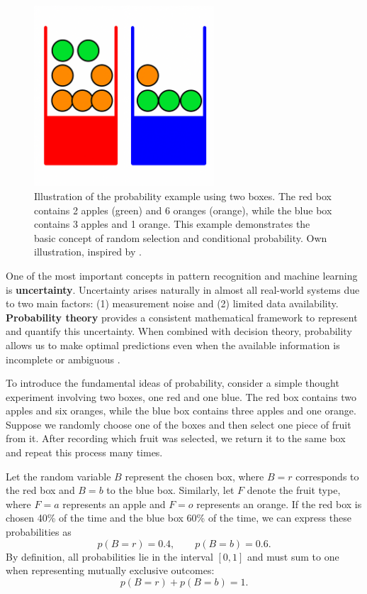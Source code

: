 \documentclass[12pt]{article}
\begin{document}
\begin{figure}[h!]
    \centering
    \includegraphics[width=0.6\textwidth]{images/probability_boxes.png}
    \caption{Illustration of the probability example using two boxes. 
    The red box contains 2 apples (green) and 6 oranges (orange), 
    while the blue box contains 3 apples and 1 orange. 
    This example demonstrates the basic concept of random selection and conditional probability. 
    Own illustration, inspired by \cite{bishop2006pattern}.}
    \label{fig:fruit_boxes}
\end{figure}

One of the most important concepts in pattern recognition and machine learning is \textbf{uncertainty}. 
Uncertainty arises naturally in almost all real-world systems due to two main factors: 
(1) measurement noise and (2) limited data availability. 
\textbf{Probability theory} provides a consistent mathematical framework to represent and quantify this uncertainty. 
When combined with decision theory, probability allows us to make optimal predictions even when the available information is incomplete or ambiguous \cite{bishop2006pattern}.

To introduce the fundamental ideas of probability, consider a simple thought experiment involving two boxes, one red and one blue. 
The red box contains two apples and six oranges, while the blue box contains three apples and one orange. 
Suppose we randomly choose one of the boxes and then select one piece of fruit from it. 
After recording which fruit was selected, we return it to the same box and repeat this process many times.

Let the random variable \( B \) represent the chosen box, where \( B = r \) corresponds to the red box and \( B = b \) to the blue box. 
Similarly, let \( F \) denote the fruit type, where \( F = a \) represents an apple and \( F = o \) represents an orange. 
If the red box is chosen 40\% of the time and the blue box 60\% of the time, we can express these probabilities as
\[
p(B = r) = 0.4, \qquad p(B = b) = 0.6.
\]
By definition, all probabilities lie in the interval \([0, 1]\) and must sum to one when representing mutually exclusive outcomes:
\[
p(B = r) + p(B = b) = 1.
\]
\end{document}
